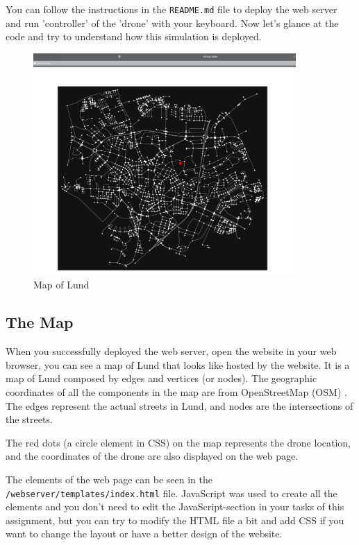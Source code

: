\documentclass{article}
\begin{document}
You can follow the instructions in the \texttt{README.md} file to deploy the web server and run 'controller' of the 'drone' with your keyboard. Now let's glance at the code and try to understand how this simulation is deployed.

\begin{figure}[h!]
    \centering
    \includegraphics[trim=200 100 200 200,clip, width=100mm]{map.png}
    \caption{Map of Lund}
    \label{fig:map}
\end{figure}

\subsection{The Map}
When you successfully deployed the web server, open the website in your web browser, you can see a map of Lund that looks like  hosted by the website. It is a map of Lund composed by edges and vertices (or nodes). The geographic coordinates of all the components in the map are from OpenStreetMap (OSM) \cite{OSM}. The edges represent the actual streets in Lund, and nodes are the intersections of the streets.


The red dots (a circle element in CSS) on the map represents the drone location, and the coordinates of the drone are also displayed on the web page.

The elements of the web page can be seen in the \texttt{/webserver/templates/index.html} file. JavaScript was used to create all the elements and you don't need to edit the JavaScript-section in your tasks of this assignment, but you can try to modify the HTML file a bit and add CSS if you want to change the layout or have a better design of the website.
\end{document}
